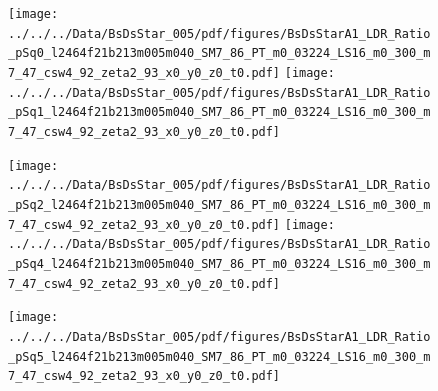 \documentclass[a4paper,10pt]{article}
\begin{document}
\begin{figure}[p]
 \texttt{[image: ../../../Data/BsDsStar\_005/pdf/figures/BsDsStarA1\_LDR\_Ratio\_pSq0\_l2464f21b213m005m040\_SM7\_86\_PT\_m0\_03224\_LS16\_m0\_300\_m7\_47\_csw4\_92\_zeta2\_93\_x0\_y0\_z0\_t0.pdf]} 
 \texttt{[image: ../../../Data/BsDsStar\_005/pdf/figures/BsDsStarA1\_LDR\_Ratio\_pSq1\_l2464f21b213m005m040\_SM7\_86\_PT\_m0\_03224\_LS16\_m0\_300\_m7\_47\_csw4\_92\_zeta2\_93\_x0\_y0\_z0\_t0.pdf]} 
 \end{figure}
\clearpage
\begin{figure}[p]
 \texttt{[image: ../../../Data/BsDsStar\_005/pdf/figures/BsDsStarA1\_LDR\_Ratio\_pSq2\_l2464f21b213m005m040\_SM7\_86\_PT\_m0\_03224\_LS16\_m0\_300\_m7\_47\_csw4\_92\_zeta2\_93\_x0\_y0\_z0\_t0.pdf]} 
 \texttt{[image: ../../../Data/BsDsStar\_005/pdf/figures/BsDsStarA1\_LDR\_Ratio\_pSq4\_l2464f21b213m005m040\_SM7\_86\_PT\_m0\_03224\_LS16\_m0\_300\_m7\_47\_csw4\_92\_zeta2\_93\_x0\_y0\_z0\_t0.pdf]} 
 \end{figure}
\begin{figure}[p]
 \texttt{[image: ../../../Data/BsDsStar\_005/pdf/figures/BsDsStarA1\_LDR\_Ratio\_pSq5\_l2464f21b213m005m040\_SM7\_86\_PT\_m0\_03224\_LS16\_m0\_300\_m7\_47\_csw4\_92\_zeta2\_93\_x0\_y0\_z0\_t0.pdf]} 
 \end{figure}
\clearpage
\end{document}
